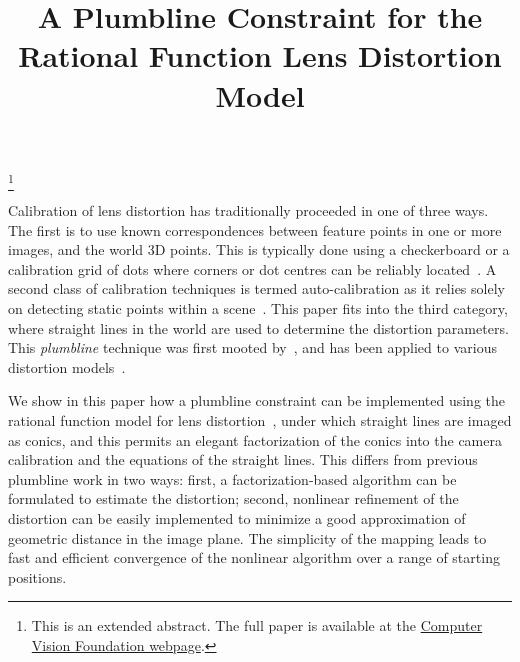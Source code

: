 \documentclass[extendedabs]{bmvc2k}
\begin{document}
\title{A Plumbline Constraint for the Rational Function Lens Distortion Model}
 
 
\maketitle
\let\thefootnote\relax\footnote{This is an extended abstract. The full paper is available at the \href{http://www.cv-foundation.org/openaccess/CVPR2015.py}{Computer Vision Foundation webpage}. }
\vspace{-0.2in}




\noindent
Calibration of lens distortion has traditionally proceeded in one
of three ways.  The first is to use known correspondences between
feature points in one or more images, and the world 3D points.
This is typically done using a checkerboard or a calibration grid
of dots where corners or dot centres can be reliably
located~\cite{Tsai86}. A second class of calibration techniques is
termed auto-calibration as it relies solely on detecting static
points within a scene~\cite{Zhang96,Fitzgibbon01}.  This paper fits
into the third category, where straight lines in the world are used
to determine the distortion parameters.  This {\em plumbline}
technique was first mooted by~\cite{Brown71}, and has been applied
to various distortion models~\cite{Devernay01,Swaminathan00}.

We show in this paper how a plumbline constraint can be implemented
using the rational function model for lens
distortion~\cite{Claus05}, under which straight lines are imaged as
conics, and this permits an elegant factorization of the conics
into the camera calibration and the equations of the straight
lines.  This differs from previous plumbline work in two ways:
first, a factorization-based algorithm can be formulated to
estimate the distortion; second, nonlinear refinement of the
distortion can be easily implemented to minimize a good
approximation of geometric distance in the image plane.  The simplicity of the mapping leads to fast and efficient convergence of the
nonlinear algorithm over a range of starting positions.
\end{document}
